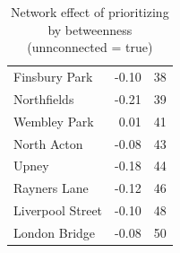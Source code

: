 \documentclass[11pt]{article} %
\begin{document}
\begin{table}[htbp]
\begin{tabular}{|l|r|r|}
Finsbury Park & -0.10 & 38 \\ 
Northfields & -0.21 & 39 \\ 
Wembley Park & 0.01 & 41 \\ 
North Acton & -0.08 & 43 \\ 
Upney & -0.18 & 44 \\ 
Rayners Lane & -0.12 & 46 \\ 
Liverpool Street & -0.10 & 48 \\ 
London Bridge & -0.08 & 50 \\ \hline
\end{tabular}
\caption{Network effect of prioritizing by betweenness \\ (unnconnected = true)}
\label{betweenness true}
\end{table}

%

\end{document}
